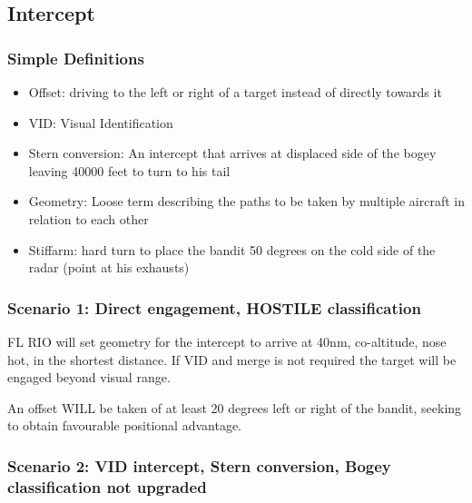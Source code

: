 \subsection{Intercept}

\subsubsection*{Simple Definitions}

\begin{itemize}
  \item Offset: driving to the left or right of a target instead of directly
  towards it

  \item VID: Visual Identification

  \item Stern conversion: An intercept that arrives at displaced side of the
    bogey leaving 40000 feet to turn to his tail

  \item Geometry: Loose term describing the paths to be taken by multiple
    aircraft in relation to each other

  \item Stiffarm: hard turn to place the bandit 50 degrees on the cold side of
    the radar (point at his exhausts)

\end{itemize}

\subsubsection*{Scenario 1: Direct engagement, HOSTILE classification}

FL RIO will set geometry for the intercept to arrive at 40nm, co-altitude, nose
hot, in the shortest distance. If VID and merge is not required the target will
be engaged beyond visual range.

An offset WILL be taken of at least 20 degrees left or right of the bandit,
seeking to obtain favourable positional advantage.

\subsubsection*{Scenario 2: VID intercept, Stern conversion, Bogey
  classification not upgraded}

